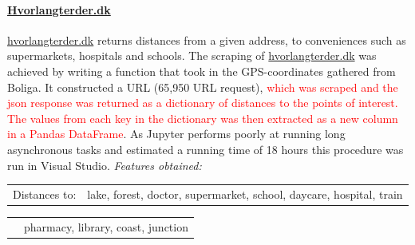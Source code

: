 \documentclass[12pt,a4paper]{article}
\begin{document}
\paragraph{\href{https://www.hvorlangterder.dk}{Hvorlangterder.dk}\newline}
\href{https://www.hvorlangterder.dk}{hvorlangterder.dk} returns distances from a given address, to conveniences such as supermarkets, hospitals and schools.   
The scraping of \href{https://www.hvorlangterder.dk}{hvorlangterder.dk} was achieved by writing a function that took in the GPS-coordinates gathered from Boliga. It constructed a URL (65,950 URL request), \textcolor{red}{which was scraped and the json response was returned as a dictionary of distances to the points of interest. The values from each key in the dictionary was then extracted as a new column in a Pandas DataFrame}.\newline
As Jupyter performs poorly at running long asynchronous tasks and estimated a running time of 18 hours this procedure was run in Visual Studio.
 \vspace*{10px} \newline
\textit{Features obtained:}\newline
\begin{tabular}{c c}
Distances to: & lake, forest, doctor, supermarket,	school, daycare, hospital, train \\	
\end{tabular}\newline 
\begin{tabular}{c c}
\qquad \qquad \qquad \qquad &  pharmacy, library, coast, junction \\	
\end{tabular}
\end{document}
